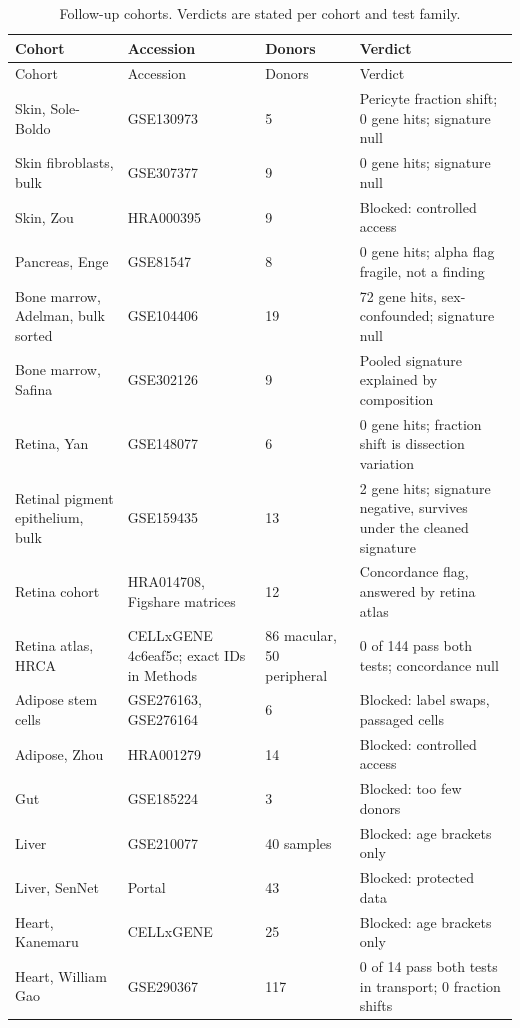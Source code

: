\documentclass[11pt]{article}
\begin{document}
{\scriptsize\setlength{\tabcolsep}{3pt}\begin{longtable}{p{}p{}p{}p{}}
\caption{Follow-up cohorts. Verdicts are stated per cohort and test family.}\label{tab:followup}\\
Cohort & Accession & Donors & Verdict \\ \hline
\endfirsthead
Cohort & Accession & Donors & Verdict \\ \hline
\endhead
Skin, Sole-Boldo & GSE130973 & 5 & Pericyte fraction shift; 0 gene hits; signature null \\ \hline
Skin fibroblasts, bulk & GSE307377 & 9 & 0 gene hits; signature null \\ \hline
Skin, Zou & HRA000395 & 9 & Blocked: controlled access \\ \hline
Pancreas, Enge & GSE81547 & 8 & 0 gene hits; alpha flag fragile, not a finding \\ \hline
Bone marrow, Adelman, bulk sorted & GSE104406 & 19 & 72 gene hits, sex-confounded; signature null \\ \hline
Bone marrow, Safina & GSE302126 & 9 & Pooled signature explained by composition \\ \hline
Retina, Yan & GSE148077 & 6 & 0 gene hits; fraction shift is dissection variation \\ \hline
Retinal pigment epithelium, bulk & GSE159435 & 13 & 2 gene hits; signature negative, survives under the cleaned signature \\ \hline
Retina cohort & HRA014708, Figshare matrices & 12 & Concordance flag, answered by retina atlas \\ \hline
Retina atlas, HRCA & CELLxGENE 4c6eaf5c; exact IDs in Methods & 86 macular, 50 peripheral & 0 of 144 pass both tests; concordance null \\ \hline
Adipose stem cells & GSE276163, GSE276164 & 6 & Blocked: label swaps, passaged cells \\ \hline
Adipose, Zhou & HRA001279 & 14 & Blocked: controlled access \\ \hline
Gut & GSE185224 & 3 & Blocked: too few donors \\ \hline
Liver & GSE210077 & 40 samples & Blocked: age brackets only \\ \hline
Liver, SenNet & Portal & 43 & Blocked: protected data \\ \hline
Heart, Kanemaru & CELLxGENE & 25 & Blocked: age brackets only \\ \hline
Heart, William Gao & GSE290367 & 117 & 0 of 14 pass both tests in transport; 0 fraction shifts \\ \hline

\end{longtable}}
\end{document}
